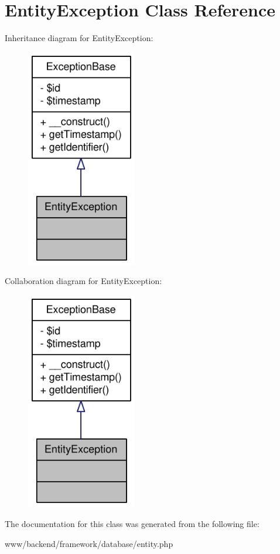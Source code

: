 \hypertarget{classEntityException}{
\section{EntityException Class Reference}
\label{classEntityException}
}


Inheritance diagram for EntityException:\nopagebreak
\begin{figure}[H]
\begin{center}
\leavevmode
\includegraphics[width=136pt]{classEntityException__inherit__graph}
\end{center}
\end{figure}


Collaboration diagram for EntityException:\nopagebreak
\begin{figure}[H]
\begin{center}
\leavevmode
\includegraphics[width=136pt]{classEntityException__coll__graph}
\end{center}
\end{figure}


The documentation for this class was generated from the following file:\begin{DoxyCompactItemize}
\item 
www/backend/framework/database/entity.php\end{DoxyCompactItemize}
